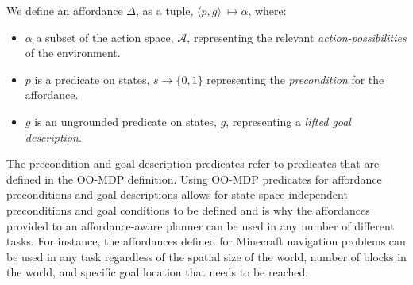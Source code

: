 \documentclass[]{article}
\begin{document}
We define an affordance $\Delta$, 
as a tuple, $\langle p,g\rangle\ \longmapsto \alpha$,
where:
\begin{itemize}
\item[] $\alpha$ a subset of the action space, $\mathcal{A}$, representing the relevant {\it action-possibilities} of the environment.
\item[] $p$ is a predicate on states, $s \longrightarrow \{$0$, 1\}$
  representing the {\em precondition} for the affordance.
\item[] $g$ is an ungrounded predicate on states, $g$, representing a {\it lifted goal description}.
\end{itemize}
The precondition and goal description predicates refer to predicates that are defined in the OO-MDP definition. 
Using OO-MDP predicates for affordance preconditions and goal descriptions 
allows for state space independent preconditions and goal conditions 
to be defined and is why the affordances provided to an
affordance-aware planner can be used in any number of different tasks. For instance, the affordances defined for Minecraft navigation problems can be used in any task regardless of the spatial size of the world, number of blocks in the world, and specific goal location that needs to be reached.

\end{document}
